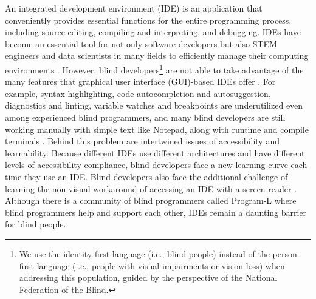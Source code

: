 \documentclass[sigconf]{acmart}
\begin{document}
An integrated development environment (IDE) is an application that
conveniently provides essential functions for the entire programming
process, including source editing, compiling and interpreting, and
debugging. IDEs have become an essential tool for not only software
developers but also STEM engineers and data scientists in many fields to
efficiently manage their computing environments
\citep{altharBuildingIntelligentIntegrated2021, crossJGRASPIntegratedDevelopment2007, janssenPyironIntegratedDevelopment2019}.
However, blind developers\footnote{We use the identity-first language
  (i.e., blind people) instead of the person-first language (i.e.,
  people with visual impairments or vision loss) when addressing this
  population, guided by the perspective of the National Federation of
  the Blind.} are not able to take advantage of the many features that
graphical user interface (GUI)-based IDEs offer
\citep{potluriCodeTalkImprovingProgramming2018}. For example, syntax
highlighting, code autocompletion and autosuggestion, diagnostics and
linting, variable watches and breakpoints are underutilized even among
experienced blind programmers, and many blind developers are still
working manually with simple text like Notepad, along with runtime and
compile terminals
\citep{mealinExploratoryStudyBlind2012, albusaysElicitingProgrammingChallenges2016, albusaysInterviewsObservationBlind2017}.
Behind this problem are intertwined issues of accessibility and
learnability. Because different IDEs use different architectures and
have different levels of accessibility compliance, blind developers face
a new learning curve each time they use an IDE. Blind developers also
face the additional challenge of learning the non-visual workaround of
accessing an IDE with a screen reader
\citep{mealinExploratoryStudyBlind2012}. Although there is a community
of blind programmers called Program-L
\citep{johnsonProgramLOnlineHelp2022} where blind programmers help and
support each other, IDEs remain a daunting barrier for blind people.
\end{document}
